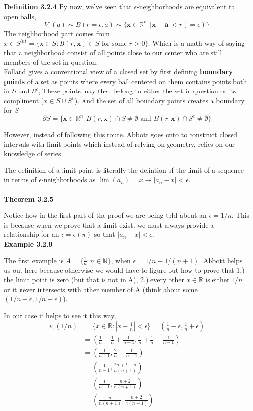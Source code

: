 \textbf{Definition 3.2.4}
By now, we've seen that $\epsilon$-neighborhoods are equivalent to open balls,
$$
V_{\epsilon} (a) \sim B(r=\epsilon, a) \sim \{ \mathbf{x}\in\mathbb{R}^n : |\mathbf{x} - \mathbf{a}| < r(=\epsilon) \}
$$
The neighborhood part comes from $x\in S^{int} = \{ \mathbf{x}\in S : B(r,\mathbf{x}) \in S \text{ for some } r>0 \}$.
Which is a math way of saying that a neighborhood consist of all points close to our center who are
still members of the set in question.
\\

Folland gives a conventional view of a closed set by first defining \textbf{boundary points}
of a set as points where every ball centered on them contains points both in $S$ and $S^c$,
These points may then belong to either the set in question or its compliment ($x\in S \cup S^v$).
And the set of all boundary points creates a boundary for $S$
$$
\partial S = \{ \mathbf{x}\in\mathbb{R}^n : B(r,\mathbf{x})\cap S \neq \emptyset \text{ and }
    B(r,\mathbf{x})\cap S^c \neq \emptyset \}
$$

However, instead of following this route, Abbott goes onto to construct closed intervals
with limit points which instead of relying on geometry, relies on our knowledge of series.

The definition of a limit point is literally the defintion of the limit of a sequence in terms of
$\epsilon$-neighborhoods as $\lim (a_n) = x \rightarrow |a_n - x| < \epsilon$.
\\~\\


\textbf{Theorem 3.2.5}

Notice how in the first part of the proof we are being told about an $\epsilon = 1/n$.
This is because when we prove that a limit exist, we must always provide a relationship for an
$\epsilon = \epsilon (n)$ so that $|a_n - x|<\epsilon$.
\\


\textbf{Example 3.2.9}

The first example is $A = \{ \frac{1}{n} : n\in\mathbb{N} \}$, when $\epsilon = 1/n - 1/(n+1)$.
Abbott helps us out here because otherwise we would have to figure out how to prove that
1.) the limit point is zero (but that is not in A), 2.) every other $x\in\mathbb{R}$ is either
$1/n$ or it never intersects with other member of A (think about some $(1/n - \epsilon, 1/n +\epsilon)$).

In our case it helps to see it this way,
\begin{align*}
v_{\epsilon} (1/n) &= \{ x\in\mathbb{R} : \left|x - \frac{1}{n}\right| < \epsilon \} = \left(\frac{1}{n} - \epsilon, \frac{1}{n} + \epsilon \right) \\
&= \left(\frac{1}{n} - \frac{1}{n} + \frac{1}{n+1}, \frac{1}{n} + \frac{1}{n} - \frac{1}{n+1} \right) \\
&= \left(\frac{1}{n+1}, \frac{2}{n} - \frac{1}{n+1} \right) \\
&= \left(\frac{1}{n+1}, \frac{2n + 2 - n}{n(n+1)} \right) \\
&= \left(\frac{1}{n+1}, \frac{n + 2}{n(n+1)} \right) \\
&= \left(\frac{n}{n(n+1)}, \frac{n + 2}{n(n+1)} \right)
\end{align*}

